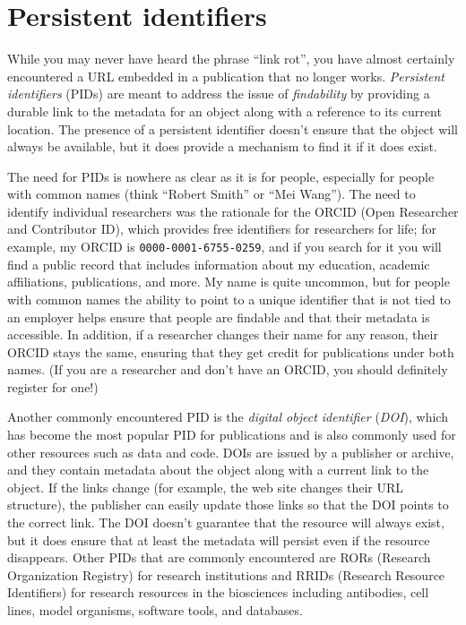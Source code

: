\section{Persistent identifiers}

While you may never have heard the phrase ``link rot'', you have almost certainly encountered a URL embedded in a publication that no longer works.  \textit{Persistent identifiers} (PIDs) are meant to address the issue of \textit{findability} by providing a durable link to the metadata for an object along with a reference to its current location.  The presence of a persistent identifier doesn't ensure that the object will always be available, but it does provide a mechanism to find it if it does exist.

The need for PIDs is nowhere as clear as it is for people, especially for people with common names (think ``Robert Smith'' or ``Mei Wang'').  The need to identify individual researchers was the rationale for the ORCID (Open Researcher and Contributor ID), which provides free identifiers for researchers for life; for example, my ORCID is \texttt{0000-0001-6755-0259}, and if you search for it you will find a public record that includes information about my education, academic affiliations, publications, and more.  My name is quite uncommon, but for people with common names the ability to point to a unique identifier that is not tied to an employer helps ensure that people are findable and that their metadata is accessible. In addition, if a researcher changes their name for any reason, their ORCID stays the same, ensuring that they get credit for publications under both names. (If you are a researcher and don't have an ORCID, you should definitely register for one!)

Another commonly encountered PID is the \textit{digital object identifier} (\textit{DOI}), which has become the most popular PID for publications and is also commonly used for other resources such as data and code.  DOIs are issued by a publisher or archive, and they contain metadata about the object along with a current link to the object.  If the links change (for example, the web site changes their URL structure), the publisher can easily update those links so that the DOI points to the correct link.  The DOI doesn't guarantee that the resource will always exist, but it does ensure that at least the metadata will persist even if the resource disappears. Other PIDs that are commonly encountered are RORs (Research Organization Registry) for research institutions and RRIDs (Research Resource Identifiers) for research resources  in the biosciences including antibodies, cell lines, model organisms, software tools, and databases.

